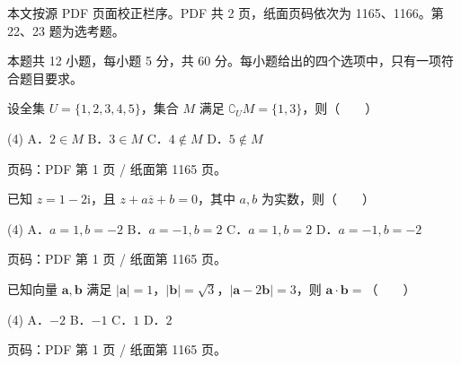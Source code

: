 

\begin{gktip}
本文按源 PDF 页面校正栏序。PDF 共 2 页，纸面页码依次为 1165、1166。第 22、23 题为选考题。
\end{gktip}


\begin{gktip}
本题共 12 小题，每小题 5 分，共 60 分。每小题给出的四个选项中，只有一项符合题目要求。
\end{gktip}

\begin{question}
设全集 $U=\{1,2,3,4,5\}$，集合 $M$ 满足 $\complement_U M=\{1,3\}$，则\mbox{（　　）}

\begin{gkopts}(4)
\task A．$2\in M$
\task B．$3\in M$
\task C．$4\notin M$
\task D．$5\notin M$
\end{gkopts}

\begin{gktip}
页码：PDF 第 1 页 / 纸面第 1165 页。
\end{gktip}

\end{question}
\begin{question}
已知 $z=1-2\mathrm i$，且 $z+a\overline z+b=0$，其中 $a,b$ 为实数，则\mbox{（　　）}

\begin{gkopts}(4)
\task A．$a=1,b=-2$
\task B．$a=-1,b=2$
\task C．$a=1,b=2$
\task D．$a=-1,b=-2$
\end{gkopts}

\begin{gktip}
页码：PDF 第 1 页 / 纸面第 1165 页。
\end{gktip}

\end{question}
\begin{question}
已知向量 $\boldsymbol a,\boldsymbol b$ 满足 $|\boldsymbol a|=1$，$|\boldsymbol b|=\sqrt3$，$|\boldsymbol a-2\boldsymbol b|=3$，则 $\boldsymbol a\cdot\boldsymbol b=$\mbox{（　　）}

\begin{gkopts}(4)
\task A．$-2$
\task B．$-1$
\task C．$1$
\task D．$2$
\end{gkopts}

\begin{gktip}
页码：PDF 第 1 页 / 纸面第 1165 页。
\end{gktip}

\end{question}
